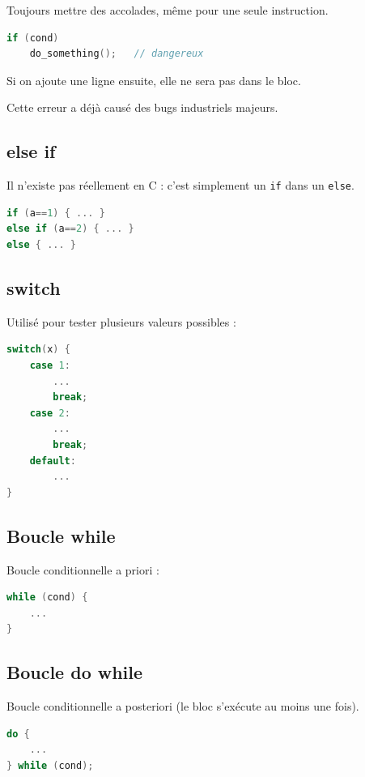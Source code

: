 Toujours mettre des accolades, même pour une seule instruction.

\begin{lstlisting}[language=C]
if (cond)
    do_something();   // dangereux
\end{lstlisting}

Si on ajoute une ligne ensuite, elle ne sera pas dans le bloc.

Cette erreur a déjà causé des bugs industriels majeurs.

\subsection{else if}

Il n’existe pas réellement en C :  
c’est simplement un \texttt{if} dans un \texttt{else}.

\begin{lstlisting}[language=C]
if (a==1) { ... }
else if (a==2) { ... }
else { ... }
\end{lstlisting}

\subsection{switch}

Utilisé pour tester plusieurs valeurs possibles :

\begin{lstlisting}[language=C]
switch(x) {
    case 1:
        ...
        break;
    case 2:
        ...
        break;
    default:
        ...
}
\end{lstlisting}

\subsection{Boucle while}

Boucle conditionnelle a priori :

\begin{lstlisting}[language=C]
while (cond) {
    ...
}
\end{lstlisting}

\subsection{Boucle do while}

Boucle conditionnelle a posteriori  
(le bloc s’exécute au moins une fois).

\begin{lstlisting}[language=C]
do {
    ...
} while (cond);

\end{lstlisting}

